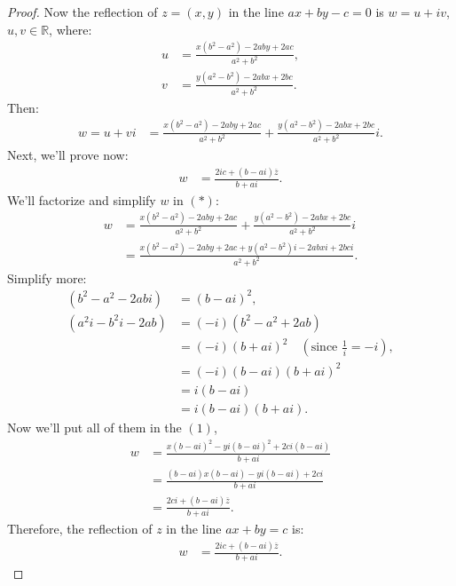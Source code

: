 \documentclass[
	12pt, %
	fleqn, %
	a4paper, %
]{LegrandOrangeBook}
\begin{document}
            \begin{proof}
                Now the reflection of $z = (x, y)$ in the line $ax + by - c = 0$ is $w = u + iv$, $u, v \in \mathbb{R}$, where:
                \begin{align*}
                u &= \frac{x(b^2 - a^2) - 2aby + 2ac}{a^2 + b^2}, \\
                v &= \frac{y(a^2 - b^2) - 2abx + 2bc}{a^2 + b^2}.
                \end{align*}
                Then:
                \begin{align*}
                w = u + vi &= \frac{x(b^2 - a^2) - 2aby + 2ac}{a^2 + b^2} + \frac{y(a^2 - b^2) - 2abx + 2bc}{a^2 + b^2}i. 
                \end{align*}
                Next, we'll prove now:
                \begin{align*}
                w &= \frac{2ic + (b - ai)\overline{z}}{b + ai}.
                \end{align*}
                We'll factorize and simplify $w$ in $(*)$:
                \begin{align*}
                w &= \frac{x(b^2 - a^2) - 2aby + 2ac}{a^2 + b^2} + \frac{y(a^2 - b^2) - 2abx + 2bc}{a^2 + b^2}i \\
                &= \frac{x(b^2 - a^2) - 2aby + 2ac + y(a^2 - b^2)i - 2abxi + 2bci}{a^2 + b^2}.
                \end{align*}
                Simplify more:
                \begin{align*}
                (b^2 - a^2 - 2abi) &= (b - ai)^2, \\
                (a^2i - b^2i - 2ab) &= (-i)(b^2 - a^2 + 2ab) \\
                &= (-i)(b + ai)^2 \quad \left(\text{since } \frac{1}{i} = -i\right), \\
                &= (-i)(b - ai)(b + ai)^2 \\
                &= i(b - ai) \\
                &= i(b - ai)(b + ai).
                \end{align*}
                Now we'll put all of them in the $(1)$,
                \begin{align*}
                w &= \frac{x(b - ai)^2 - yi(b - ai)^2 + 2ci(b - ai)}{b + ai} \\
                &= \frac{(b - ai)x(b - ai) - yi(b - ai) + 2ci}{b + ai} \\
                &= \frac{2ci + (b - ai)\overline{z}}{b + ai}.
                \end{align*}
                Therefore, the reflection of $z$ in the line $ax + by = c$ is:
                \begin{align*}
                w &= \frac{2ic + (b - ai)\overline{z}}{b + ai}.
                \end{align*}
                \end{proof}
               
\end{document}
